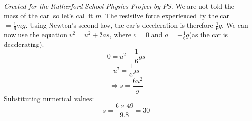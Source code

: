 
\begin{problem} 
{ 
}
{\textit{Created for the Rutherford School Physics Project by PS.}}
{We are not told the mass of the car, so let's call it $m$. The resistive force experienced by the car $= \frac{1}{6}mg$. Using Newton's second law, the car's deceleration is therefore $\frac{1}{6}g$. We can now use the equation $v^2 = u^2 + 2as$, where $v = 0$ and $a = -\frac{1}{6}g$(as the car is decelerating).
\begin{equation*}	0 = u^2 - \frac{1}{6}gs	\end{equation*}
\begin{equation*}	u^2 = \frac{1}{6}gs	\end{equation*}
\begin{equation*}	\Rightarrow s = \frac{6u^2}{g}	\end{equation*}
Substituting numerical values:
\begin{equation*}	s = \frac{6\times 49}{9.8} = 30	\end{equation*}
}
\end{problem}